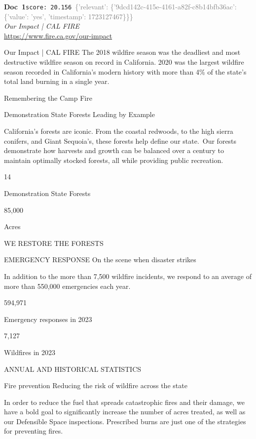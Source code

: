 \documentclass[a4paper,11pt]{article}
\begin{document}
\begin{docenv}
{\footnotesize\textcolor{doccolor}{\textbf{Doc~1}}}\hfill{\tiny\texttt{score:~20.156}}\ {\tiny\textcolor{gray}{\{'relevant': \{'9dcd142c-415e-4161-a82f-c8b14bfb36ac': \{'value': 'yes', 'timestamp': 1723127467\}\}\}}}\\[3pt]
{\small\textit{Our Impact | CAL FIRE}}\\[2pt]
{\tiny\url{https://www.fire.ca.gov/our-impact}}\\[4pt]
{\footnotesize Our Impact | CAL FIRE
The 2018 wildfire season was the deadliest and most destructive wildfire season on record in California. 
2020 was the largest wildfire season recorded in California's modern history with more than 4\% of the state's total land burning in a single year. 

Remembering the Camp Fire

Demonstration State Forests
Leading by Example

California’s forests are iconic. From the coastal redwoods, to the high sierra conifers, and Giant Sequoia’s, these forests help define our state. Our forests demonstrate how harvests and growth can be balanced over a century to maintain optimally stocked forests, all while providing public recreation. 


 14
 
Demonstration State Forests


 85,000
 
Acres

WE RESTORE THE FORESTS

EMERGENCY RESPONSE
On the scene when disaster strikes

 In addition to the more than 7,500 wildfire incidents, we respond to an average of more than 550,000 emergencies each year. 
 


 594,971
 
Emergency responses in 2023


 7,127
 
Wildfires in 2023

ANNUAL AND HISTORICAL STATISTICS

Fire prevention
Reducing the risk of wildfire across the state

 In order to reduce the fuel that spreads catastrophic fires and their damage, we have a bold goal to significantly increase the number of acres treated, as well as our Defensible Space inspections. Prescribed burns are just one of the strategies for preventing fires. 
 
}
\end{docenv}
\end{document}
